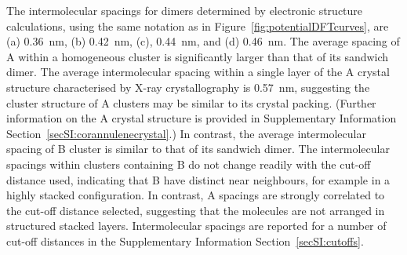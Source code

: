 The intermolecular spacings for dimers determined by electronic structure calculations, using the same notation as in Figure~\ref{fig:potentialDFTcurves}, are (a) 0.36~nm, (b) 0.42~nm, (c), 0.44~nm, and (d) 0.46~nm. The average spacing of A within a homogeneous cluster is significantly larger than that of its sandwich dimer. The average intermolecular spacing within a single layer of the A crystal structure characterised by X-ray crystallography is 0.57~nm, suggesting the cluster structure of A clusters may be similar to its crystal packing. (Further information on the A crystal structure is provided in Supplementary Information Section~\ref{secSI:corannulenecrystal}.) In contrast, the average intermolecular spacing of B cluster is similar to that of its sandwich dimer. The intermolecular spacings within clusters containing B do not change readily with the cut-off distance used, indicating that B have distinct near neighbours, for example in a highly stacked configuration. In contrast, A spacings are strongly correlated to the cut-off distance selected, suggesting that the molecules are not arranged in structured stacked layers. Intermolecular spacings are reported for a number of cut-off distances in the Supplementary Information Section~\ref{secSI:cutoffs}.

